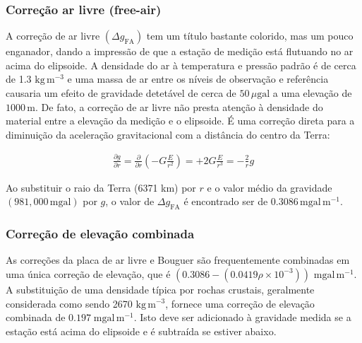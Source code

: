 \documentclass[]{book}
\theoremstyle{definition}
\theoremstyle{definition}
\theoremstyle{definition}
\theoremstyle{remark}
\begin{document}
\hypertarget{correcao-ar-livre-free-air}{%
\subsubsection{Correção ar livre (free-air)}\label{correcao-ar-livre-free-air}}

A correção de ar livre \(\left(\Delta g_{\mathrm{FA}}\right)\) tem um título bastante colorido, mas um pouco enganador, dando a impressão de que a estação de medição está flutuando no ar acima do elipsoide. A densidade do ar à temperatura e pressão padrão é de cerca de 1.3 \(\mathrm{kg}\,\mathrm{m}^{-3}\) e uma massa de ar entre os níveis de observação e referência causaria um efeito de gravidade detetável de cerca de \(50\,\mu\mathrm{gal}\) a uma elevação de \(1000\,\mathrm{m}\). De fato, a correção de ar livre não presta atenção à densidade do material entre a elevação da medição e o elipsoide. É uma correção direta para a diminuição da aceleração gravitacional com a distância do centro da Terra:

\begin{align}
\frac{\partial g}{\partial r}=\frac{\partial}{\partial r}\left(-G \frac{E}{r^{2}}\right)=+2 G \frac{E}{r^{3}}=-\frac{2}{r} g \label{eq:0244}
\end{align}

Ao substituir o raio da Terra (6371 km) por \(r\) e o valor médio da gravidade \((981,000\, \mathrm{mgal})\) por \(g\), o valor de \(\Delta g_{\mathrm{FA}}\) é encontrado ser de \(0.3086\,\mathrm{mgal}\,\mathrm{m}^{-1}\).

\hypertarget{correcao-de-elevacao-combinada}{%
\subsubsection{Correção de elevação combinada}\label{correcao-de-elevacao-combinada}}

As correções da placa de ar livre e Bouguer são frequentemente combinadas em uma única correção de elevação, que é \((0.3086 - (0.0419\rho\times 10^{-3}))\) \(\mathrm{mgal}\,\mathrm{m}^{-1}\). A substituição de uma densidade típica por rochas crustais, geralmente considerada como sendo 2670 \(\mathrm{kg}\,\mathrm{m}^{-3}\), fornece uma correção de elevação combinada de \(0.197\;\mathrm{mgal}\,\mathrm{m}^{-1}\). Isto deve ser adicionado à gravidade medida se a estação está acima do elipsoide e é subtraída se estiver abaixo.
\end{document}
